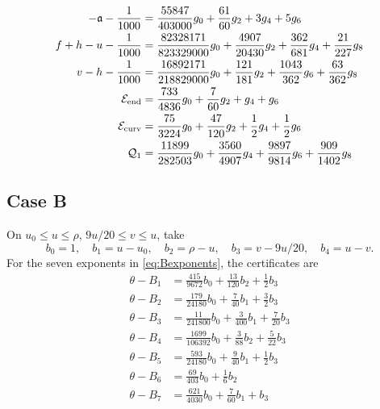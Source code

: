 \documentclass[11pt,a4paper]{article}
\numberwithin{equation}{section}
\theoremstyle{remark}
\newcommand{\Qone}{\mathcal Q_1}
\begin{document}
\begin{align}
-\mathfrak a-\frac1{1000} &= \frac{55847}{403000}g_{0}+\frac{61}{60}g_{2}+3g_{4}+5g_{6}\label{cert:boundary:10}\\
f+h-u-\frac1{1000} &= \frac{82328171}{823329000}g_{0}+\frac{4907}{20430}g_{2}+\frac{362}{681}g_{4}+\frac{21}{227}g_{8}\label{cert:boundary:11}\\
v-h-\frac1{1000} &= \frac{16892171}{218829000}g_{0}+\frac{121}{181}g_{2}+\frac{1043}{362}g_{6}+\frac{63}{362}g_{8}\label{cert:boundary:12}\\
\mathcal E_{\rm end} &= \frac{733}{4836}g_{0}+\frac{7}{60}g_{2}+g_{4}+g_{6}\label{cert:boundary:13}\\
\mathcal E_{\rm curv} &= \frac{75}{3224}g_{0}+\frac{47}{120}g_{2}+\frac{1}{2}g_{4}+\frac{1}{2}g_{6}\label{cert:boundary:14}\\
\Qone &= \frac{11899}{282503}g_{0}+\frac{3560}{4907}g_{4}+\frac{9897}{9814}g_{6}+\frac{909}{1402}g_{8}\label{cert:boundary:15}
\end{align}
\endgroup


\subsection{Case B}
On $u_0\le u\le\rho$, $9u/20\le v\le u$, take
\[
 b_0=1,\quad b_1=u-u_0,\quad b_2=\rho-u,\quad
 b_3=v-9u/20,\quad b_4=u-v.
\]
For the seven exponents in \eqref{eq:Bexponents}, the certificates are
\begingroup
\small
\begin{align}
\theta-B_1 &= \frac{415}{9672}b_{0}+\frac{13}{120}b_{2}+\frac{1}{2}b_{3}\label{cert:case_b:1}\\
\theta-B_2 &= \frac{179}{24180}b_{0}+\frac{7}{40}b_{1}+\frac{3}{2}b_{3}\label{cert:case_b:2}\\
\theta-B_3 &= \frac{11}{241800}b_{0}+\frac{3}{400}b_{1}+\frac{7}{20}b_{3}\label{cert:case_b:3}\\
\theta-B_4 &= \frac{1699}{106392}b_{0}+\frac{3}{88}b_{2}+\frac{5}{22}b_{3}\label{cert:case_b:4}\\
\theta-B_5 &= \frac{593}{24180}b_{0}+\frac{9}{40}b_{1}+\frac{1}{2}b_{3}\label{cert:case_b:5}\\
\theta-B_6 &= \frac{69}{403}b_{0}+\frac{1}{6}b_{2}\label{cert:case_b:6}\\
\theta-B_7 &= \frac{621}{4030}b_{0}+\frac{7}{60}b_{1}+b_{3}\label{cert:case_b:7}
\end{align}
\endgroup
\end{document}
